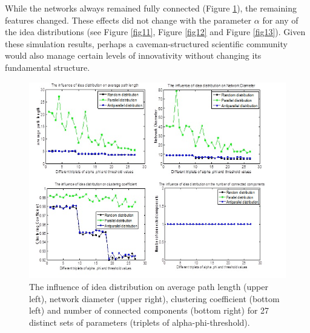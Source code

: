 While the networks always remained fully connected (Figure \ref{fig9}), the remaining features changed. These effects did not change with the parameter $\alpha$ for any of the idea distributions (see Figure \ref{fig11}, Figure \ref{fig12} and Figure \ref{fig13}). Given these simulation results, perhaps a caveman-structured scientific community would also manage certain levels of innovativity without changing its fundamental structure.

\begin{figure}
[htp]
\begin{center}
\includegraphics{Fig9}
\end{center}
\caption{The influence of idea distribution on average path length (upper left), network diameter (upper right), clustering coefficient (bottom left) and number of connected components (bottom right) for 27 distinct sets of parameters (triplets of alpha-phi-threshold). }
\label {fig9}
\end{figure}

